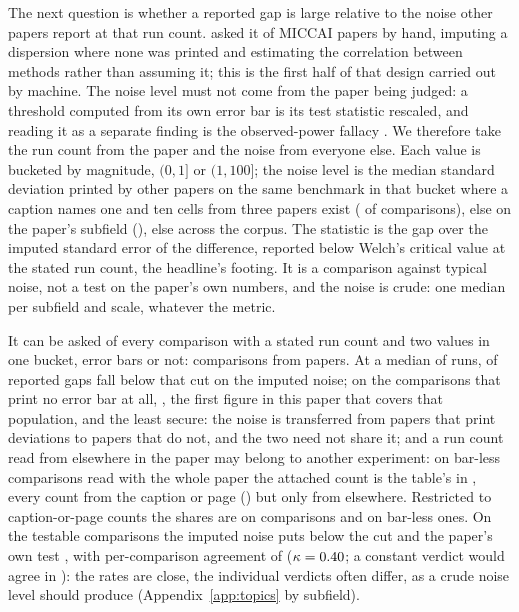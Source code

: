 \documentclass{article}
\begin{document}
The next question is whether a reported gap is large relative to the noise
other papers report at that run count. \citet{christodoulou2025false} asked it
of MICCAI papers by hand, imputing a dispersion where none was printed and
estimating the correlation between methods rather than assuming it; this is
the first half of that design carried out by machine. The noise level must
not come from the paper being judged: a threshold computed from its own error
bar is its test statistic rescaled, and reading it as a separate finding is
the observed-power fallacy \citep{hoenig2001abuse}. We therefore take the run
count from the paper and the noise from everyone else. Each value is bucketed
by magnitude, $(0, 1]$ or $(1, 100]$; the noise level is the median standard
deviation printed by other papers on the same benchmark in that bucket where
a caption names one and ten cells from three papers exist
(\nDesignPctBenchmarkSd{} of comparisons), else on the paper's subfield
(\nDesignPctSubfieldSd{}), else across the corpus. The statistic is the gap
over the imputed standard error of the difference, reported below Welch's
critical value at the stated run count, the headline's footing. It is a
comparison against typical noise, not a test on the paper's own numbers, and
the noise is crude: one median per subfield and scale, whatever the metric.

It can be asked of every comparison with a stated run count and two values in
one bucket, error bars or not: \nDesignMdeN{} comparisons from
\nDesignMdePapers{} papers. At a median of
\nDesignMedianRuns{} runs, \nPctBelowAlphaThreshold{} of reported gaps fall
below that cut on the imputed noise; on the \nDesignMdeNoBarsN{} comparisons
that print no error bar at all,
\nPctBelowAlphaThresholdNoBars{}, the first figure in this paper that covers
that population, and the least secure: the noise is transferred from papers
that print deviations to papers that do not, and the two need not share it;
and a run count read from elsewhere in the paper may belong to another
experiment: on \nNobarNN{} bar-less comparisons read with the whole paper the
attached count is the table's in \nNobarNAppliesFrac{}, every count from the
caption or page (\nNobarNLocalFrac{}) but only \nNobarNPaperFrac{} from
elsewhere. Restricted to caption-or-page counts the shares are
\nDesignLocalBelow{} on \nDesignLocalN{} comparisons and
\nDesignNoBarsLocalBelow{} on \nDesignNoBarsLocalN{} bar-less ones.
On the \nDesignSameN{} testable comparisons the imputed noise puts
\nDesignSameBorrowed{} below the cut and the paper's own test
\nDesignSameOwn{}, with per-comparison agreement of \nDesignSameAgree{}
($\kappa = 0.40{}$; a constant verdict would agree in
\nDesignSameConstant{}): the rates are close, the individual verdicts often
differ, as a crude noise level should produce (Appendix~\ref{app:topics} by
subfield).
\end{document}
